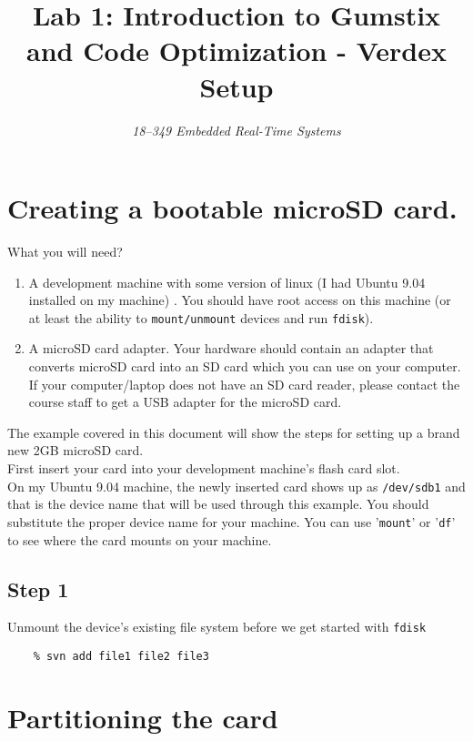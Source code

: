 \documentclass{article}
\title{\huge Lab 1: Introduction to Gumstix and Code Optimization 
       - Verdex Setup}
\author{\Large\itshape 18--349 Embedded Real-Time Systems}
\begin{document}
	\maketitle

	\section{Creating a bootable microSD card.}

   What you will need?  \\

   \begin{enumerate}
   \item A development machine with some version of linux (I had Ubuntu 9.04
         installed on my machine) .  You should have root access on  this 
         machine (or at least the ability to \texttt{mount/unmount} devices and
         run \texttt{fdisk}).  
   \item A  microSD card adapter. Your hardware should contain an adapter that
         converts microSD card into an SD card which you can use on your
         computer. If your computer/laptop does not have an SD card reader,
         please contact the course staff  to get a USB adapter for the microSD
         card.   
   \end{enumerate}

   The example covered in this document will show the steps for setting up 
   a brand new 2GB microSD card. \\

   First insert your card into your development machine's flash card slot. \\

   On my Ubuntu 9.04 machine, the newly inserted card shows up as
   \texttt{/dev/sdb1} and that  is the device name that will be used through
   this example. You should substitute the proper device name for your machine.
   You can use '\texttt{mount}' or '\texttt{df}' to see where the card mounts
   on your machine. 

   \subsection{Step 1}
   Unmount the device's existing file system before we get started
   with \texttt{fdisk} 
	\begin{verbatim} 
	% svn add file1 file2 file3 
	\end{verbatim}

   \section{Partitioning the card}
\end{document}
